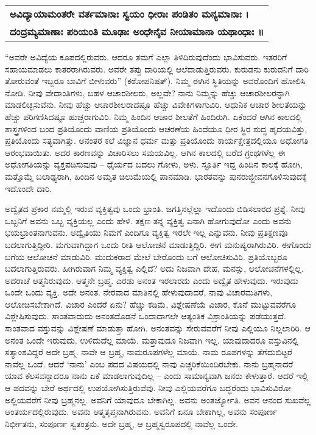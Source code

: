 \begin{longtable}[c]{@{}l@{}}
\textbf{{\small ಅವಿದ್ಯಾಯಾಮಂತರೇ ವರ್ತಮಾನಾಃ ಸ್ವಯಂ ಧೀರಾಃ ಪಂಡಿತಂ ಮನ್ಯಮಾನಾಃ ।}} \\
\textbf{{\small ದಂದ್ರಮ್ಯಮಾಣಾಃ ಪರಿಯಂತಿ ಮೂಢಾಃ ಅಂಧೇನೈವ ನೀಯಾಮಾನಾ ಯಥಾಂಧಾಃ ॥}} \\
\end{longtable}

“ಅವರೇ ಅವಿದ್ಯೆಯ ಕೂಪದಲ್ಲಿರುವರು. ಆದರೂ ತಮಗೆ ಎಲ್ಲಾ ತಿಳಿದಿರುವುದೆಂದು ಭಾವಿಸುವರು. ಇತರರಿಗೆ ಸಹಾಯಮಾಡಲು ಕಾತರರಾಗಿರುವರು. ಅವರೇ ತಪ್ಪು ದಾರಿಯಲ್ಲಿ ಆಲೆದಾಡುತ್ತಿರುವರು. ಕುರುಡನು ಕುರುಡನಿಗೆ ದಾರಿ ತೋರುವಂತೆ ಇಬ್ಬರೂ ಬಾವಿಗೆ ಬೀಳುವರು” (ಕಠೋಪನಿಷತ್​). ನಿಮ್ಮ ಈಗಿನ ಸ್ಥಿತಿಯನ್ನು ಅವರೊಂದಿಗೆ ಹೋಲಿಸಿ ನೋಡಿ. ನೀವು ವೇದಾಂತಿಗಳು, ಬಹಳ ಆಚಾರಶೀಲರು, ಅಲ್ಲವೇ? ನಾನು ನಿಮ್ಮನ್ನು ಹೆಚ್ಚು ಆಚಾರಶೀಲರನ್ನಾಗಿ ಮಾಡಲಿಚ್ಛಿಸುವೆನು. ನೀವು ಹೆಚ್ಚು ಆಚಾರಶೀಲರಾದಷ್ಟೂ ಹೆಚ್ಚು ವಿವೇಕಿಗಳಾಗುವಿರಿ. ಆಧುನಿಕ ಆಚಾರ ಶೀಲತೆಯನ್ನು ಹೆಚ್ಚು ಪರಿಗಣಿಸಿದಷ್ಟೂ ಹುಚ್ಚರಾಗುವಿರಿ. ನಿಮ್ಮ ಹಿಂದಿನ ಆಚಾರ ಶೀಲತೆಗೆ ಹಿಂದಿರುಗಿ. ಏಕೆಂದರೆ ಆಗಿನ ಕಾಲದಲ್ಲಿ ಶಾಸ್ತ್ರಗಳಿಂದ ಬಂದ ಪ್ರತಿಯೊಂದು ವಾಣಿಯ ಪ್ರತಿಯೊಂದು ಆಚರಣೆಯ ಹಿಂದೆಯೂ ಧೀರ ಸ್ಥಿರ ಶುದ್ಧ ಹೃದಯವಿತ್ತು, ಪ್ರತಿಯೊಂದು ಸತ್ಯವಾಗಿತ್ತು. ಅನಂತರ ಕಲೆ ವಿಜ್ಞಾನ ಧರ್ಮ ಮತ್ತು ಪ್ರತಿಯೊಂದು ಕಾರ್ಯಕ್ಷೇತ್ರದಲ್ಲಿಯೂ ಅಧೋಗತಿ ಆರಂಭವಾಯಿತು. ಅದರ ಕಾರಣವನ್ನು ವಿಚಾರಿಸಲು ಸಮಯವಿಲ್ಲ. ಆಗಿನ ಕಾಲದಲ್ಲಿ ಬರೆದ ಗ್ರಂಥಗಳೆಲ್ಲ ಈ ಅಧೋಗತಿಯನ್ನು ವ್ಯಕ್ತಪಡಿಸುವುವು – ಧೈರ್ಯದ ಬದಲು ಗೋಳು, ಅಳು. ಸ್ಫೂರ್ತಿ ಇದ್ದ ಹಿಂದಿನ ಕಾಲಕ್ಕೆ ಹೋಗಿ, ಮತ್ತೊಮ್ಮೆ ಬಲಾಢ್ಯರಾಗಿ, ಹಿಂದಿನ ಅಮೃತ ಚಿಲುಮೆಯಲ್ಲಿ ಪಾನಮಾಡಿ. ಭಾರತವನ್ನು ಪುನರುಜ್ಜೀವನಗೊಳಿಸುವುದಕ್ಕೆ ಇದೊಂದೇ ದಾರಿ.

ಅದ್ವೈತದ ಪ್ರಕಾರ ನಮ್ಮಲ್ಲಿ ಇರುವ ವ್ಯಕ್ತಿತ್ವವು ಒಂದು ಭ್ರಾಂತಿ. ಜಗತ್ತಿನಲ್ಲೆಲ್ಲಾ ಇದೊಂದು ಬಿಡಿಸಲಾರದ ಪ್ರಶ್ನೆ. ನೀವು ಒಬ್ಬನಿಗೆ ಅವನು ಒಬ್ಬ ವ್ಯಕ್ತಿಯಲ್ಲ ಎಂದು ಹೇಳಿ. ತಕ್ಷಣ ತನ್ನ ವ್ಯಕ್ತಿತ್ವ ಏನಾಗಿ ಹೋಗುವುದೋ ಎಂದು ಅವನು ಭಯಭ್ರಾಂತನಾಗುವನು. ಅದ್ವೈತಿಯು ನಿಮಗೆ ಎಂದಿಗೂ ವ್ಯಕ್ತಿತ್ವ ಇರಲೇ ಇಲ್ಲ ಎನ್ನುವನು. ನೀವು ಪ್ರತಿಕ್ಷಣವೂ ಬದಲಾಗುತ್ತಿದ್ದೀರಿ. ಮಗುವಾಗಿದ್ದಾಗ ಒಂದು ರೀತಿ ಆಲೋಚನೆ ಮಾಡುತ್ತಿದ್ದಿರಿ. ಈಗ ಮನುಷ್ಯರಾಗಿರುವಿರಿ. ಈಗೊಂದು ಬಗೆಯ ಆಲೋಚನೆ ಮಾಡುವಿರಿ. ಮುದುಕರಾದ ಮೇಲೆ ಬೇರೊಂದು ಬಗೆ ಆಲೋಚಿಸುವಿರಿ. ಪ್ರತಿಯೊಬ್ಬರೂ ಬದಲಾಗುತ್ತಿರುವರು. ಹೀಗಿರುವಾಗ ನಿಮ್ಮ ವ್ಯಕ್ತಿತ್ವ ಎಲ್ಲಿದೆ? ಅದು ನಿಜವಾಗಿ ದೇಹ, ಮನಸ್ಸು, ಆಲೋಚನೆಗಳಲ್ಲಿಲ್ಲ. ಅದರಾಚೆ ಆತ್ಮನಿರುವುದು. ಆತ್ಮನೇ ಬ್ರಹ್ಮ. ಎರಡು ಅನಂತ ಇರಲಾರದು ಎಂದು ಅದ್ವೈತ ಹೇಳುವುದು. ಇರುವುದು ಒಂದೇ ಒಂದು ವ್ಯಕ್ತಿ. ಅದೇ ಅನಂತ. ನೇರವಾದ ಮಾತಿನಲ್ಲಿ ಹೇಳುವುದಾದರೆ, ನಾವು ವಿಚಾರಮತಿಗಳು, ಆಲೋಚಿಸಬೇಕಾಗಿದೆ. ವಿಚಾರ ಎಂದರೆ ಏನು? ಹೆಚ್ಚು ಕಡಿಮೆ, ವಿಶ್ಲೇಷಣೆಯೆ ವಿಚಾರ, ಕೊನೆ ಮುಟ್ಟುವವರೆಗೂ ವಿಶ್ಲೇಷಿಸುವುದು. ಸಾಂತವಾದುದು ಅನಂತದೊಡನೆ ಒಂದಾದಾಗಲೇ ಆತ್ಯಂತಿಕ ವಿಶ್ರಾಂತಿಯನ್ನು ಪಡೆಯುತ್ತದೆ. ಸಾಂತವಾದ ವಸ್ತುವನ್ನು ವಿಶ್ಲೇಷಣೆ ಮಾಡುತ್ತಾ ಹೋಗಿ. ಅನಂತವನ್ನು ಸೇರುವವರೆಗೆ ನೀವು ಎಲ್ಲಿಯೂ ನಿಲ್ಲಲಾರಿರಿ. ಆ ಅನಂತ ಒಂದೇ ಇರುವುದು. ಉಳಿದುದೆಲ್ಲ ಮಾಯೆ. ಮತ್ತಾವುದೂ ನಿಜವಾಗಿ ಇಲ್ಲ. ಯಾವುದಾದರೂ ವಸ್ತುವಿನಲ್ಲಿ ಸತ್ಯಾಂಶವಿದ್ದರೆ ಅದೇ ಬ್ರಹ್ಮ. ನಾವೇ ಆ ಬ್ರಹ್ಮ, ನಾಮರೂಪಗಳೆಲ್ಲ ಮಾಯೆ. ನಾಮ ರೂಪಗಳನ್ನು ತೆಗೆದುಬಿಟ್ಟರೆ ನಾವೆಲ್ಲ ಒಂದೆ. ಆದರೆ ‘ನಾನು’ ಎಂಬ ಪದದ ವಿಷಯದಲ್ಲಿ ನಾವು ಎಚ್ಚರಿಕೆಯಿಂದಿರಬೇಕು. ನಾನು ಬ್ರಹ್ಮನಾದರೆ ಯಾವ ಕೆಲಸವನ್ನಾದರೂ ನಾನು ಏಕೆ ಮಾಡಲಾಗುವುದಿಲ್ಲ – ಎಂದು ಸಾಮಾನ್ಯವಾಗಿ ಜನರು ಕೇಳುತ್ತಾರೆ. ಆದರೆ ಇಲ್ಲಿ ಆ ಪದವನ್ನು ಬೇರೆ ಅರ್ಥದಲ್ಲಿ ಉಪಯೋಗಿಸುತ್ತಿರುವೆವು. ನೀವು ಎಲ್ಲಿಯವರೆಗೂ ಬದ್ಧರೆಂದು ಭಾವಿಸುವಿರೋ ಅಲ್ಲಿಯವರೆಗೆ ನೀವು ಬ್ರಹ್ಮನಲ್ಲ. ಅವನಿಗೆ ಯಾವುದೂ ಬೇಕಾಗಿಲ್ಲ. ಅವನು ಅಂತರ್ಜ್ಯೋತಿ. ಅವನ ಆನಂದ ಸುಖವೆಲ್ಲ ಆಂತರ್ಯದಲ್ಲಿರುವುದು. ಅವನು ಆತ್ಮತೃಪ್ತನಾಗಿರುವನು. ಅವನಿಗೆ ಏನೂ ಬೇಕಾಗಿಲ್ಲ, ಅವನು ಸಂಪೂರ್ಣ ನಿರ್ಭೀತನು, ಸಂಪೂರ್ಣ ಸ್ವತಂತ್ರನು. ಅದೇ ಬ್ರಹ್ಮ, ಆ ಬ್ರಹ್ಮಸ್ವರೂಪದಲ್ಲಿ ನಾವೆಲ್ಲ ಒಂದೇ.

